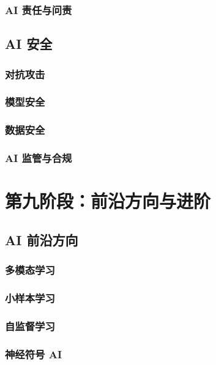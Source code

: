 \documentclass[12pt,UTF8]{ctexbook}
\begin{document}
\section{AI 责任与问责}

\chapter{AI 安全}
\label{chap:ai_security}

\section{对抗攻击}

\section{模型安全}

\section{数据安全}

\section{AI 监管与合规}

\part{第九阶段：前沿方向与进阶}

\chapter{AI 前沿方向}
\label{chap:ai_frontier}

\section{多模态学习}

\section{小样本学习}

\section{自监督学习}

\section{神经符号 AI}
\end{document}
